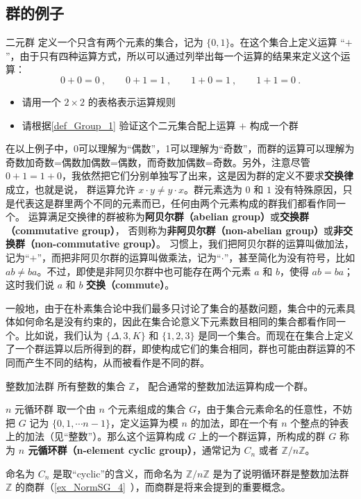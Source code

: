\subsection{群的例子}

\begin{exercise}{二元群}\label{exe_Group_1}
定义一个只含有两个元素的集合，记为 $\{0, 1\}$。在这个集合上定义运算 “$+$”，由于只有四种运算方式，所以可以通过列举出每一个运算的结果来定义这个运算：
\begin{equation}\label{eq_Group_1}
0+0=0~, \qquad 0+1=1~, \qquad 1+0=1~, \qquad 1+1=0~.
\end{equation}
\begin{itemize}
\item 请用一个 $2\times2$ 的表格表示运算规则
\item 请根据\autoref{def_Group_1} 验证这个二元集合配上运算 $+$ 构成一个群
\end{itemize}
\end{exercise}

在以上例子中，0可以理解为“偶数”，1可以理解为“奇数”，而群的运算可以理解为奇数加奇数=偶数加偶数=偶数，而奇数加偶数=奇数。另外，注意尽管 $0+1=1+0$，我依然把它们分别单独写了出来，这是因为群的定义不要求\textbf{交换律}成立，也就是说， 群运算允许 $x\cdot y\neq y\cdot x$。群元素选为 $0$ 和 $1$ 没有特殊原因，只是代表这是群里两个不同的元素而已，任何由两个元素构成的群我们都看作同一个。 运算满足交换律的群被称为\textbf{阿贝尔群（abelian group）}或\textbf{交换群（commutative group）}， 否则称为\textbf{非阿贝尔群（non-abelian group）}或\textbf{非交换群（non-commutative group）}。 习惯上，我们把阿贝尔群的运算叫做加法，记为“$+$”，而把非阿贝尔群的运算叫做乘法，记为“$\cdot$”，甚至简化为没有符号，比如 $ab\not= ba$。不过，即使是非阿贝尔群中也可能存在两个元素 $a$ 和 $b$，使得 $ab=ba$；这时我们说 $a$ 和 $b$ \textbf{交换（commute）}。

一般地，由于在朴素集合论中我们最多只讨论了集合的基数问题，集合中的元素具体如何命名是没有约束的，因此在集合论意义下元素数目相同的集合都看作同一个。比如说，我们认为 $\{\Delta,3, K\}$ 和 $\{1,2,3\}
$ 是同一个集合。而现在在集合上定义了一个群运算以后所得到的群，即使构成它们的集合相同，群也可能由群运算的不同而产生不同的结构，从而被看作是不同的群。

\begin{example}{整数加法群}\label{ex_Group_1}
所有整数的集合 $\mathbb Z$， 配合通常的整数加法运算构成一个群。
\end{example}

\begin{example}{$n$ 元循环群}\label{ex_Group_2}
取一个由 $n$ 个元素组成的集合 $G$，由于集合元素命名的任意性，不妨把 $G$ 记为 $\{0, 1, \cdots n-1\}$，定义运算为模 $n$ 的加法，即在一个有 $n$ 个整点的钟表上的加法（见“整数”）。那么这个运算构成 $G$ 上的一个群运算，所构成的群 $G$ 称为 \textbf{$n$ 元\textbf{循环群（n-element cyclic group）}}，通常记为 $C_n$ 或者 $\mathbb{Z}/n\mathbb{Z}$。

命名为 $C_n$ 是取“cyclic”的含义，而命名为 $\mathbb{Z}/n\mathbb{Z}$ 是为了说明循环群是整数加法群 $\mathbb{Z}$ 的商群（\autoref{ex_NormSG_4}~），而商群是将来会提到的重要概念。
\end{example}

